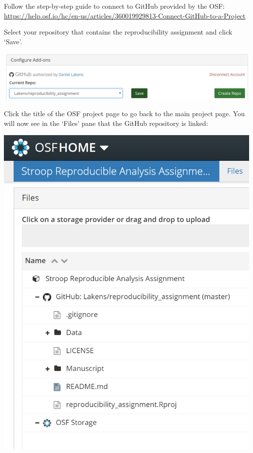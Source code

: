 \documentclass[
  oneside]{krantz}
\begin{document}
Follow the step-by-step guide to connect to GitHub provided by the OSF:
\url{https://help.osf.io/hc/en-us/articles/360019929813-Connect-GitHub-to-a-Project}

Select your repository that contains the reproducibility assignment and click
`Save'.

\begin{center}\includegraphics[width=1\linewidth]{images/7570fb87913b1d687a9b8a3a72948e24} \end{center}

Click the title of the OSF project page to go back to the main project page. You
will now see in the `Files' pane that the GitHub repository is linked:

\begin{center}\includegraphics[width=1\linewidth]{images/4ecc8e0af472a95a3f01baf3af0538cf} \end{center}
\end{document}
